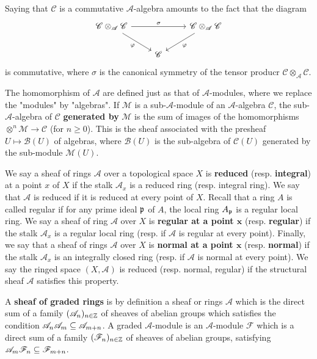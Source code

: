 Saying that $\mathscr{C}$ is a commutative $\mathscr{A}$-algebra amounts to the fact that the diagram
\[\begin{tikzcd}
\mathscr{C}\otimes_{\mathscr{A}}\mathscr{C}\ar[rd,swap,"\varphi"]\ar[rr,"\sigma"]&&\mathscr{C}\otimes_{\mathscr{A}}\mathscr{C}\ar[ld,"\varphi"]\\
&\mathscr{C}&
\end{tikzcd}\]
is commutative, where $\sigma$ is the canonical symmetry of the tensor producr $\mathscr{C}\otimes_{\mathscr{A}}\mathscr{C}$.\par
The homomorphism of $\mathscr{A}$ are defined just as that of $\mathscr{A}$-modules, where we replace the "modules" by "algebras". If $\mathscr{M}$ is a sub-$\mathscr{A}$-module of an $\mathscr{A}$-algebra $\mathscr{C}$, the sub-$\mathscr{A}$-algebra of $\mathscr{C}$ \textbf{generated by} $\mathscr{M}$ is the sum of images of the homomorphisms $\otimes^n\mathscr{M}\to\mathscr{C}$ (for $n\geq 0$). This is the sheaf associated with the presheaf $U\mapsto\mathscr{B}(U)$ of algebras, where $\mathscr{B}(U)$ is the sub-algebra of $\mathscr{C}(U)$ generated by the sub-module $\mathscr{M}(U)$.\par
We say a sheaf of rings $\mathscr{A}$ over a topological space $X$ is \textbf{reduced} (resp. \textbf{integral}) at a point $x$ of $X$ if the stalk $\mathscr{A}_x$ is a reduced ring (resp. integral ring). We say that $\mathscr{A}$ is reduced if it is reduced at every point of $X$. Recall that a ring $A$ is called regular if for any prime ideal $\mathfrak{p}$ of $A$, the local ring $A_{\mathfrak{p}}$ is a regular local ring. We say a sheaf of ring $\mathscr{A}$ over $X$ is \textbf{regular at a point $\bm{x}$} (resp. \textbf{regular}) if the stalk $\mathscr{A}_x$ is a regular local ring (resp. if $\mathscr{A}$ is regular at every point). Finally, we say that a sheaf of rings $\mathscr{A}$ over $X$ is \textbf{normal at a point $\bm{x}$} (resp. \textbf{normal}) if the stalk $\mathscr{A}_x$ is an integrally closed ring (resp. if $\mathscr{A}$ is normal at every point). We say the ringed space $(X,\mathscr{A})$ is reduced (resp. normal, regular) if the structural sheaf $\mathscr{A}$ satisfies this property.\par
A \textbf{sheaf of graded rings} is by definition a sheaf or rings $\mathscr{A}$ which is the direct sum of a family $(\mathscr{A}_n)_{n\in\mathbb{Z}}$ of sheaves of abelian groups which satisfies the condition $\mathscr{A}_n\mathscr{A}_m\subseteq\mathscr{A}_{m+n}$. A graded $\mathscr{A}$-module is an $\mathscr{A}$-module $\mathscr{F}$ which is a direct sum of a family $(\mathscr{F}_n)_{n\in\mathbb{Z}}$ of sheaves of abelian groups, satisfying $\mathscr{A}_m\mathscr{F}_n\subseteq\mathscr{F}_{m+n}$.\par

